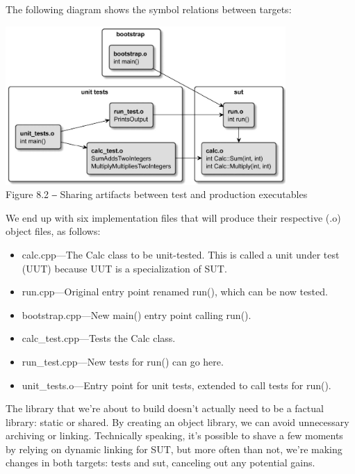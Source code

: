 The following diagram shows the symbol relations between targets:

\begin{center}
\includegraphics[width=0.8\textwidth]{content/3/chapter8/images/2.jpg}\\
Figure 8.2 ‒ Sharing artifacts between test and production executables
\end{center}

We end up with six implementation files that will produce their respective (.o) object files, as follows:

\begin{itemize}
\item 
calc.cpp—The Calc class to be unit-tested. This is called a unit under test (UUT) because UUT is a specialization of SUT.

\item 
run.cpp—Original entry point renamed run(), which can be now tested.

\item 
bootstrap.cpp—New main() entry point calling run().

\item 
calc\_test.cpp—Tests the Calc class.

\item 
run\_test.cpp—New tests for run() can go here.

\item 
unit\_tests.o—Entry point for unit tests, extended to call tests for run().
\end{itemize}

The library that we're about to build doesn't actually need to be a factual library: static or shared. By creating an object library, we can avoid unnecessary archiving or linking. Technically speaking, it's possible to shave a few moments by relying on dynamic linking for SUT, but more often than not, we're making changes in both targets: tests and sut, canceling out any potential gains.

